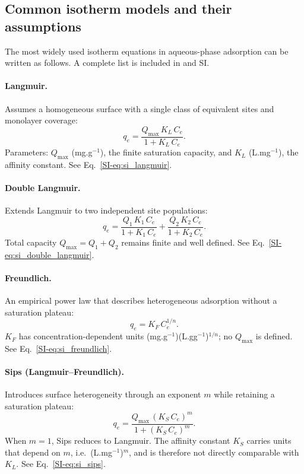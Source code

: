 \documentclass[journal=jacsat,manuscript=article]{achemso}
\begin{document}
	\subsection{Common isotherm models and their assumptions}
	\label{sec:models}

	The most widely used isotherm equations in aqueous-phase adsorption can be written as follows. A complete list is included in   and SI.

\paragraph{Langmuir.}
Assumes a homogeneous surface with a single class of equivalent sites and monolayer coverage:
\begin{equation}
	q_e = \frac{Q_{\max}\, K_L\, C_e}{1 + K_L\, C_e}.
	\label{eq:langmuir}
\end{equation}
Parameters: $Q_{\max}$ (mg.g$^{-1}$), the finite saturation capacity, and $K_L$ (L.mg$^{-1}$), the affinity constant.
See Eq.~\eqref{SI-eq:si_langmuir}.

\paragraph{Double Langmuir.}
Extends Langmuir to two independent site populations:
\begin{equation}
	q_e = \frac{Q_1\, K_1\, C_e}{1 + K_1\, C_e}
	    + \frac{Q_2\, K_2\, C_e}{1 + K_2\, C_e}.
	\label{eq:double_langmuir}
\end{equation}
Total capacity $Q_{\max} = Q_1 + Q_2$ remains finite and well defined.
See Eq.~\eqref{SI-eq:si_double_langmuir}.

\paragraph{Freundlich.}
An empirical power law that describes heterogeneous adsorption without a saturation plateau:
\begin{equation}
	q_e = K_F\, C_e^{1/n}.
	\label{eq:freundlich}
\end{equation}
$K_F$ has concentration-dependent units (mg.g$^{-1}$)(L.gg$^{-1}$)$^{1/n}$; no $Q_{\max}$ is defined.
See Eq.~\eqref{SI-eq:si_freundlich}.

	\paragraph{Sips (Langmuir--Freundlich).}
	Introduces surface heterogeneity through an exponent $m$ while retaining a saturation plateau:
	\begin{equation}
		q_e = \frac{Q_{\max}\,(K_S\, C_e)^{m}}{1 + (K_S\, C_e)^{m}}.
		\label{eq:sips}
	\end{equation}
	When $m = 1$, Sips reduces to Langmuir. The affinity constant $K_S$ carries units that depend on $m$, i.e.\ (L.mg$^{-1}$)$^{m}$, and is therefore not directly comparable with $K_L$.
	See Eq.~\eqref{SI-eq:si_sips}.
	
\end{document}
